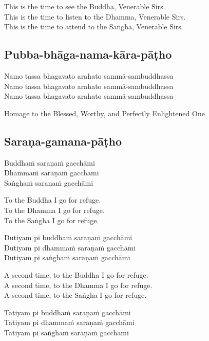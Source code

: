 \begin{english}
  This is the time to see the Buddha, Venerable Sirs.\\
  This is the time to listen to the Dhamma, Venerable Sirs.\\
  This is the time to attend to the Saṅgha, Venerable Sirs.
\end{english}

\suttaRef{[Thai]}

\subsection{Pubba-bhāga-nama-kāra-pāṭho}
Namo tassa bhagavato arahato sammā-sambuddhassa\\
Namo tassa bhagavato arahato sammā-sambuddhassa\\
Namo tassa bhagavato arahato sammā-sambuddhassa

\begin{english}
  Homage to the Blessed, Worthy, and Perfectly Enlightened One
\end{english}

\subsection{Saraṇa-gamana-pāṭho}
Buddhaṁ saraṇaṁ gacchāmi\\
Dhammaṁ saraṇaṁ gacchāmi\\
Saṅghaṁ saraṇaṁ gacchāmi

\begin{english}
  To the Buddha I go for refuge.\\
  To the Dhamma I go for refuge.\\
  To the Saṅgha I go for refuge.
\end{english}

Dutiyam pi buddhaṁ saraṇaṁ gacchāmi\\
Dutiyam pi dhammaṁ saraṇaṁ gacchāmi\\
Dutiyam pi saṅghaṁ saraṇaṁ gacchāmi

\begin{english}
  A second time, to the Buddha I go for refuge.\\
  A second time, to the Dhamma I go for refuge.\\
  A second time, to the Saṅgha I go for refuge.
\end{english}

Tatiyam pi buddhaṁ saraṇaṁ gacchāmi\\
Tatiyam pi dhammaṁ saraṇaṁ gacchāmi\\
Tatiyam pi saṅghaṁ saraṇaṁ gacchāmi

